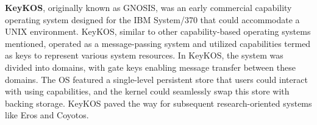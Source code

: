 \textbf{KeyKOS}, originally known as GNOSIS, was an early commercial capability operating system designed 
for the IBM System/370 that could accommodate a UNIX environment. KeyKOS, similar to other 
capability-based operating systems mentioned, operated as a message-passing system and 
utilized capabilities termed as keys to represent various system resources. In KeyKOS, 
the system was divided into domains, with gate keys enabling message transfer between 
these domains. The OS featured a single-level persistent store that users could interact 
with using capabilities, and the kernel could seamlessly swap this store with backing storage. 
KeyKOS paved the way for subsequent research-oriented systems like Eros and Coyotos.
\newline

